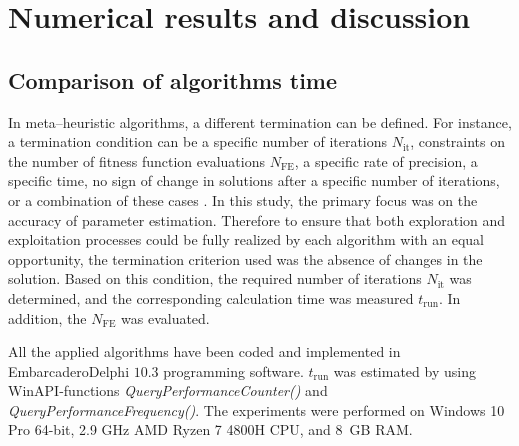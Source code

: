 \documentclass[a4paper,fleqn]{cas-dc}
\begin{document}




\section{Numerical results and discussion}\label{Result}

\subsection{Comparison of algorithms time}
In meta--heuristic algorithms, a different termination can be defined.
For instance, a termination condition can be a specific number of iterations $N_\mathrm{it}$,
constraints on the number of fitness function evaluations $N_\mathrm{FE}$,
a specific rate of precision,
a specific time,
no sign of change in solutions after a specific number of iterations,
or a combination of these cases \cite{IntelligentChaoticClonal}.
In this study, the primary focus was on the accuracy of parameter estimation.
Therefore to ensure that both exploration and exploitation processes could be fully realized 
by each algorithm with an equal opportunity, the termination criterion used was the absence of changes in the solution.
Based on this condition, the required number of iterations $N_\mathrm{it}$ was determined,
and the corresponding calculation time was measured $t_\mathrm{run}$.
In addition, the $N_\mathrm{FE}$ was evaluated.

All the applied algorithms have been coded and implemented in Embarcadero\textregistered Delphi $10.3$ programming software.
$t_\mathrm{run}$ was estimated by using WinAPI-functions \emph{QueryPerformanceCounter()} and \emph{QueryPerformanceFrequency()}.
The experiments were performed on Windows 10 Pro 64-bit,
2.9 GHz AMD Ryzen 7 4800H CPU, and 8~GB RAM.

\end{document}
